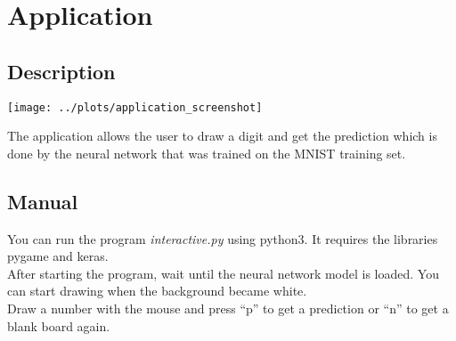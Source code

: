 
\section{Application}

\subsection{Description}

\texttt{[image: ../plots/application\_screenshot]}

The application allows the user to draw a digit and get the prediction
which is done by the neural network that was trained on the MNIST training set.

\subsection{Manual}

You can run the program \textit{interactive.py} using python3.
It requires the libraries pygame and keras.\\

After starting the program, wait until the neural network model is loaded.
You can start drawing when the background became white.\\
Draw a number with the mouse and press ``p'' to get a prediction or ``n'' to get a blank board again.